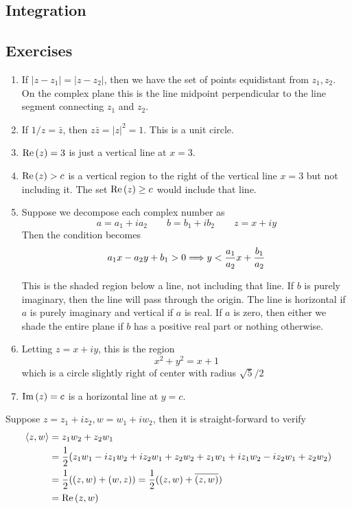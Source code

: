 \newpage 
\subsection{Integration}

\newpage 
\subsection{Exercises}

\begin{exercise} \hfill
	\begin{enumerate}[label=\alph*)]
		\item If $|z - z_1| = |z - z_2|$, then we have the set of points equidistant from $z_1, z_2$. On the complex plane this is the line midpoint perpendicular to the line segment connecting $z_1$ and $z_2$. 
		\item If $1/z = \bar z$, then $z\bar z = |z|^2 = 1$. This is a unit circle.
		\item $\Re\left(z\right) = 3$ is just a vertical line at $x = 3$.
		\item $\Re\left(z\right) > c$ is a vertical region to the right of the vertical line $x = 3$ but not including it. The set $\Re\left(z\right) \geq c$ would include that line.
		\item Suppose we decompose each complex number as
		\[ a = a_1 + i a_2 \qquad b = b_1 + i b_2 \qquad z = x + i y \]
		Then the condition becomes
		\[ a_1 x - a_2 y + b_1 > 0 \Longrightarrow y < \frac{a_1}{a_2} x + \frac{b_1}{a_2} \]
		
		This is the shaded region below a line, not including that line. If $b$ is purely imaginary, then the line will pass through the origin. The line is horizontal if $a$ is purely imaginary and vertical if $a$ is real. If $a$ is zero, then either we shade the entire plane if $b$ has a positive real part or nothing otherwise.
		\item Letting $z = x + iy$, this is the region
		\[ x^2 + y^2 = x + 1 \]
		which is a circle slightly right of center with radius $\sqrt{5}/2$
		\item $\Im\left(z\right) = c$ is a horizontal line at $y = c$.
	\end{enumerate}
\end{exercise}

\begin{exercise}
	Suppose $z = z_1 + iz_2, w = w_1 + iw_2$, then it is straight-forward to verify
	\begin{align*}
		\left\langle z,w \right\rangle &= z_1 w_2 + z_2 w_1 \\
		&= \frac{1}{2}( z_1w_1 - iz_1w_2 + iz_2w_1 + z_2w_2 + z_1w_1 + iz_1w_2 - iz_2w_1 + z_2w_2 ) \\
		&= \frac{1}{2}( (z,w) + (w,z) ) = \frac{1}{2}( (z,w) + \overline{(z,w)} ) \\
		&= \Re\left(z,w\right)
	\end{align*}
\end{exercise}

